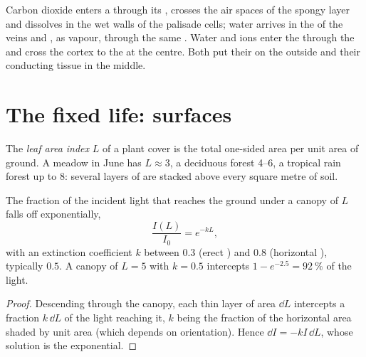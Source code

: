 \begin{example}\label{ex:b1:flowering-plant-organization:where}
Carbon dioxide enters a  through its , crosses the air
spaces of the spongy layer and dissolves in the wet walls of the
palisade cells; water arrives in the  of the veins and ,
as vapour, through the same . Water and ions enter the 
through the  and cross the cortex to the  at the centre.
Both  put their  on the outside and their
conducting tissue in the middle.
\end{example}

\section{The fixed life: surfaces}

\begin{definition}\label{def:b1:flowering-plant-organization:lai}
The \emph{leaf area index} $L$ of a plant cover
is the total one-sided  area per unit area of ground. A meadow in
June has $L \approx 3$, a deciduous forest \qtyrange{4}{6}{}, a
tropical rain forest up to \qty{8}{}: several layers of  are
stacked above every square metre of soil.
\end{definition}

\begin{proposition}\label{prop:b1:flowering-plant-organization:beer}
The fraction of the incident light that reaches the ground under a
canopy of  $L$ falls off exponentially,
\[
\frac{I(L)}{I_0} = e^{-kL},
\]
with an extinction coefficient $k$ between $0.3$ (erect ) and
$0.8$ (horizontal ), typically $0.5$. A canopy of $L = 5$ with
$k = 0.5$ intercepts $1 - e^{-2.5} = \qty{92}{\%}$ of the light.
\end{proposition}
\begin{proof}
Descending through the canopy, each thin layer of  area $\dd L$
intercepts a fraction $k\,\dd L$ of the light reaching it, $k$ being
the fraction of the horizontal area shaded by unit  area (which
depends on  orientation). Hence $\dd I = -kI\,\dd L$, whose
solution is the exponential.
\end{proof}

